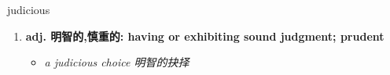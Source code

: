 
\begin{frame}
{\huge judicious}
\begin{center}
\begin{enumerate}\Large
  \item \textbf{adj. 明智的,慎重的: having or exhibiting sound judgment; prudent}
  \begin{itemize}
    \item \em{\Large{a judicious choice 明智的抉择}}
  \end{itemize}
\end{enumerate}
\end{center}
\end{frame}
